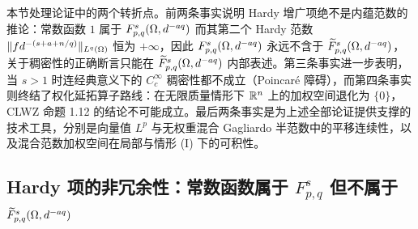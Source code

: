 
本节处理论证中的两个转折点。前两条事实说明 Hardy 增广项绝不是内蕴范数的推论：常数函数 $1$ 属于 $F^{s}_{p,q}(\Omega,d^{-aq})$ 而其第二个 Hardy 范数 $\|f d^{-(s+a+n/q)}\|_{L^q(\Omega)}$ 恒为 $+\infty$，因此 $F^{s}_{p,q}(\Omega,d^{-aq})$ 永远不含于 $\widetilde F^{s}_{p,q}(\Omega,d^{-aq})$，关于稠密性的正确断言只能在 $\widetilde F^{s}_{p,q}(\Omega,d^{-aq})$ 内部表述。第三条事实进一步表明，当 $s>1$ 时连经典意义下的 $C_c^\infty$ 稠密性都不成立（Poincaré 障碍），而第四条事实则终结了权化延拓算子路线：在无限质量情形下 $\mathbb{R}^n$ 上的加权空间退化为 $\{0\}$，CLWZ 命题 1.12 的结论不可能成立。最后两条事实是为上述全部论证提供支撑的技术工具，分别是向量值 $L^p$ 与无权重混合 Gagliardo 半范数中的平移连续性，以及混合范数加权空间在局部与情形 (I) 下的可积性。

\subsection{Hardy 项的非冗余性：常数函数属于 \texorpdfstring{$F^{s}_{p,q}$}{Fsp} 但不属于 \texorpdfstring{$\widetilde F^{s}_{p,q}(\Omega,d^{-aq})$}{tilde F}}

